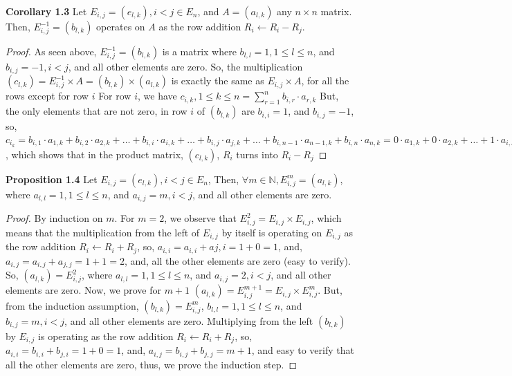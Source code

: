 \documentclass[12pt]{article}
\begin{document}
\newpage
\textbf{Corollary 1.3} \newline
Let $E_{i,j}=(e_{l,k}),i<j \in E_n$, and $A=(a_{l,k})$ any $n \times n$ matrix. Then,\newline
$E_{i,j}^{-1}=(b_{l,k})$ operates on $A$ as the row addition $R_i \leftarrow R_i-R_j$.
\begin{proof}
As seen above, $E_{i,j}^{-1}=(b_{l,k})$ is a matrix where $b_{l,l}=1,1 \leq l \leq n$, and $b_{i,j}=-1,i<j$, and all other elements are zero. \newline
So, the multiplication $(c_{l,k})=E_{i,j}^{-1} \times A=(b_{l,k}) \times (a_{l,k})$ is exactly the same as $E_{i,j} \times A$, for all the rows except for row $i$ \newline
For row $i$, we have $c_{i,k},1 \leq k \leq n=\sum_{r=1}^n b_{i,r} \cdot a_{r,k}$ \newline
But, the only elements that are not zero, in row $i$ of $(b_{l,k})$ are $b_{i,i}=1$, and $b_{i,j}=-1$, so, $c_{i_k}=b_{i,1} \cdot a_{1,k}+b_{i,2} \cdot a_{2,k}+\dots+b_{i,i} \cdot a_{i,k}+\dots+b_{i,j} \cdot a_{j,k}+\dots+b_{i,n-1} \cdot a_{n-1,k}+b_{i,n} \cdot a_{n,k}=0 \cdot a_{1,k}+0 \cdot a_{2,k}+\dots+1 \cdot a_{i,k}+\dots+(-1) \cdot a_{j,k}+\dots+0 \cdot a_{n-1,k}+0 \cdot a_{n,k}=0+0+\dots+a_{i,k}+\dots+(-a_{j,k})=a_{i,k}-a_{j,k}$, which shows that in the product matrix, $(c_{l,k})$, $R_i$ turns into $R_i-R_j$ \newline
\end{proof}
\textbf{Proposition 1.4} \newline
Let $E_{i,j}=(e_{l,k}),i<j \in E_n$, Then,\newline
$\forall m \in \mathbb{N},E_{i,j}^m=(a_{l,k})$, where $a_{l,l}=1,1 \leq l \leq n$, and $a_{i,j}=m,i<j$, and all other elements are zero.
\begin{proof}
By induction on $m$. \newline
For $m=2$, we observe that $E_{i,j}^2=E_{i,j} \times E_{i,j}$, which means that the multiplication from the left of $E_{i,j}$ by itself is operating on $E_{i,j}$ as the row addition $R_i \leftarrow R_i+R_j$, so, $a_{i,i}=a_{i,i}+a{j,i}=1+0=1$, and, $a_{i,j}=a_{i,j}+a_{j,j}=1+1=2$, and, all the other elements are zero (easy to verify). \newline 
So, $(a_{l,k})=E_{i,j}^2$, where $a_{l,l}=1,1 \leq l \leq n$, and $a_{i,j}=2,i<j$, and all other elements are zero. \newline
Now, we prove for $m+1$ \newline
$(a_{l,k})=E_{i,j}^{m+1}=E_{i,j} \times E_{i,j}^m$. But, from the induction assumption, $(b_{l,k})=E_{i,j}^m$, $b_{l,l}=1,1 \leq l \leq n$, and $b_{i,j}=m,i<j$, and all other elements are zero. \newline
Multiplying from the left $(b_{l,k})$ by $E_{i,j}$ is operating as the row addition $R_i \leftarrow R_i+R_j$, so, $a_{i,i}=b_{i,i}+b_{j,i}=1+0=1$, and, $a_{i,j}=b_{i,j}+b_{j,j}=m+1$, and easy to verify that all the other elements are zero, thus, we prove the induction step. \newline
\end{proof}
\end{document}
